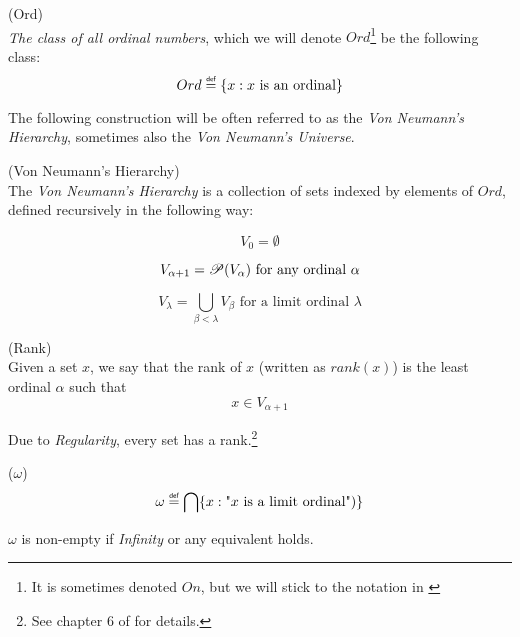 \begin{definition}{(Ord)}\label{def:ord}\\
\emph{The class of all ordinal numbers}, which we will denote $Ord$\footnote{It is sometimes denoted $On$, but we will stick to the notation in \cite{JechBook}} be the following class:
\begin{equation}
Ord \defeq \{x : x\mbox{ is an ordinal}\}
\end{equation}
\end{definition}

The following construction will be often referred to as the \emph{Von Neumann's Hierarchy}, sometimes also the \emph{Von Neumann's Universe}. %

\begin{definition}{(Von Neumann's Hierarchy)}\label{def:von_neumann}\\
The \emph{Von Neumann's Hierarchy} is a collection of sets indexed by elements of $Ord$, defined recursively in the following way:
\bce[(i)]
\item 
\begin{equation}
V_0 = \emptyset
\end{equation}
\item 
\begin{equation}
V_{\alpha+1} = \mathscr{P} (V_\alpha)\mbox{ for any ordinal $\alpha$}
\end{equation}
\item
\begin{equation} 
V_\lambda = \bigcup_{\beta < \lambda} V_\beta \mbox{ for a limit ordinal $\lambda$}
\end{equation}
\ece
\end{definition}

\begin{definition}{(Rank)}\label{def:rank}\\
Given a set $x$, we say that the rank of $x$ (written as $rank(x)$) is the least ordinal $\alpha$ such that
\begin{equation}
x \in V_{\alpha+1}
\end{equation}
\end{definition}
Due to \emph{Regularity}, every set has a rank.\footnote{See chapter 6 of \cite{JechBook} for details.}

\begin{definition}{($\omega$)}\label{def:omega}\\
\begin{equation}
\omega \defeq \bigcap\{x : \mbox{"$x$ is a limit ordinal"})\}
\end{equation}
\end{definition}
$\omega$ is non-empty if \emph{Infinity} or any equivalent holds.

